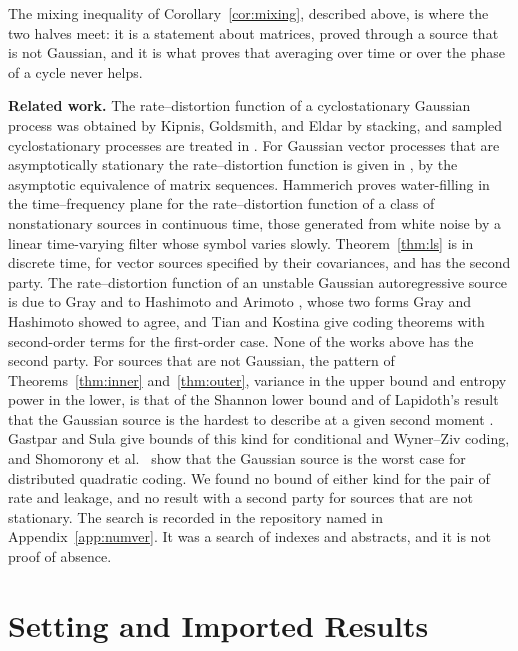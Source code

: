 \documentclass[11pt,onecolumn]{IEEEtran}
\begin{document}
The mixing inequality of Corollary~\ref{cor:mixing}, described above,
is where the two halves meet: it is a statement about matrices, proved
through a source that is not Gaussian, and it is what proves that
averaging over time or over the phase of a cycle never helps.

\textbf{Related work.} The rate--distortion function of a
cyclostationary Gaussian process was obtained by Kipnis, Goldsmith,
and Eldar \cite{kipnis2018} by stacking, and sampled cyclostationary
processes are treated in \cite{abakasanga2020}. For Gaussian vector
processes that are asymptotically stationary the rate--distortion
function is given in \cite{gutierrez2018}, by the asymptotic
equivalence of matrix sequences. Hammerich \cite{hammerich2016} proves
water-filling in the time--frequency plane for the rate--distortion
function of a class of nonstationary sources in continuous time, those
generated from white noise by a linear time-varying filter whose
symbol varies slowly. Theorem~\ref{thm:ls} is in discrete time, for
vector sources specified by their covariances, and has the second
party. The rate--distortion function of an unstable Gaussian
autoregressive source is due to Gray \cite{gray1970} and to Hashimoto
and Arimoto \cite{hashimoto1980}, whose two forms Gray and Hashimoto
\cite{grayhashimoto2008} showed to agree, and Tian and Kostina
\cite{tian2019} give coding theorems with second-order terms for the
first-order case. None of the works above has the second party. For sources that are not
Gaussian, the pattern of Theorems~\ref{thm:inner}
and~\ref{thm:outer}, variance in the upper bound and entropy power in
the lower, is that of the Shannon lower bound
\cite{berger1971,linder1994,koch2016} and of Lapidoth's result that
the Gaussian source is the hardest to describe at a given second
moment \cite{lapidoth1997}. Gastpar and Sula \cite{gastpar2024} give
bounds of this kind for conditional and Wyner--Ziv coding, and
Shomorony et al.\ \cite{shomorony2012} show that the Gaussian source is
the worst case for distributed quadratic coding. We found no bound of
either kind for the pair of rate and leakage, and no result with a
second party for sources that are not stationary. The search is
recorded in the repository named in Appendix~\ref{app:numver}. It was a
search of indexes and abstracts, and it is not proof of absence.

\section{Setting and Imported Results}
\label{sec:model}
\end{document}
